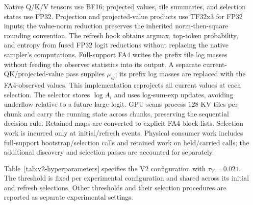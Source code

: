 Native Q/K/V tensors use BF16; projected values, tile summaries, and
selection states use FP32. Projection and projected-value products use
TF32x3 for FP32 inputs; the value-norm reduction preserves the inherited
norm-then-square rounding convention. The refresh hook obtains argmax,
top-token probability, and entropy from fused FP32 logit reductions without
replacing the native sampler's computations. Full-support FA4 writes the prefix tile log
masses without feeding the observer statistics into its output. A separate
current-QK/projected-value pass supplies $\mu_{ij}$; its prefix log masses
are replaced with the FA4-observed values. This implementation reprojects
all current values at each selection. The selector stores $\log A_i$ and
uses log-sum-exp updates, avoiding underflow relative to a future large
logit. GPU scans process $128$ KV tiles per chunk and carry the running
state across chunks, preserving the sequential decision rule. Retained maps
are converted to explicit FA4 block lists. Selection work is incurred only
at initial/refresh events. Physical consumer work includes full-support
bootstrap/selection calls and retained work on held/carried calls; the
additional discovery and selection passes are accounted for separately.

Table~\ref{tab:v2-hyperparameters} specifies the V2 configuration with
$\tau_V=0.021$. The threshold is fixed per experimental configuration and
shared across its initial and refresh selections. Other thresholds and
their selection procedures are reported as separate experimental settings.

